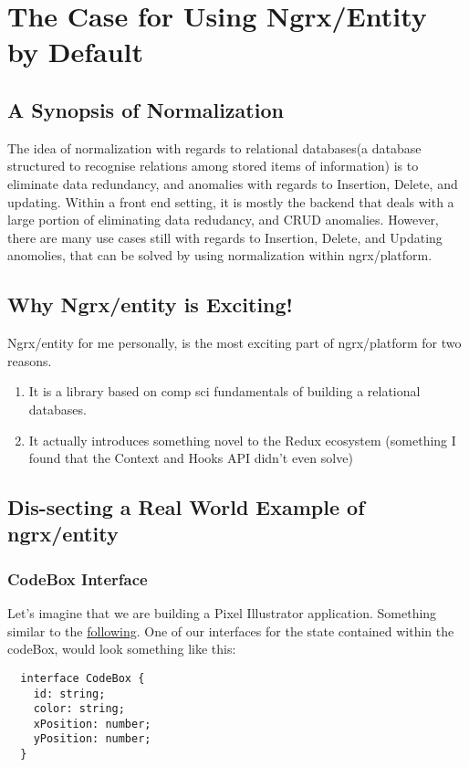 \maketitle{}
\section{ The Case for Using Ngrx/Entity by Default}

\subsection{ A Synopsis of Normalization}
The idea of normalization with regards to relational databases(a database
structured to recognise relations among stored items of information) is to
eliminate data redundancy, and anomalies with regards to Insertion, Delete, and
updating. Within a front end setting, it is mostly the backend that deals with
a large portion of eliminating data redudancy, and CRUD anomalies. However,
there are many use cases still with regards to Insertion, Delete, and Updating
anomolies, that can be solved by using normalization within ngrx/platform.

\subsection{Why Ngrx/entity is Exciting!}
Ngrx/entity for me personally, is the most exciting part of ngrx/platform for
two reasons.
\begin{enumerate}
  \item It is a library based on comp sci fundamentals of building a relational
  databases.
  \item It actually introduces something novel to the Redux ecosystem (something
  I found that the Context and Hooks API didn't even solve)
\end{enumerate}

\subsection{Dis-secting a Real World Example of ngrx/entity}

\subsubsection{CodeBox Interface}
Let's imagine that we are building a Pixel Illustrator application. Something
similar to the \href{http://charliegreenman.github.io/codeILL/}{following}. One
of our interfaces for the state contained within the codeBox, would look
something like this:
\begin{lstlisting}
  interface CodeBox {
    id: string;
    color: string;
    xPosition: number;
    yPosition: number;
  }
\end{lstlisting}

